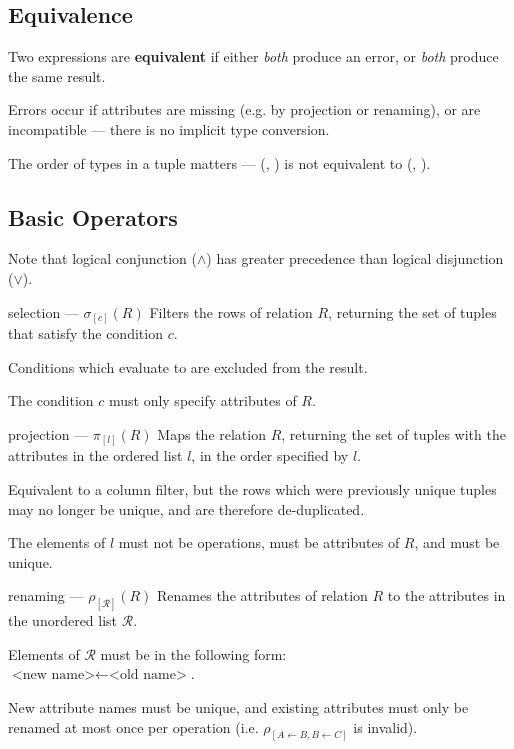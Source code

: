 \subsection{Equivalence}
Two expressions are \textbf{equivalent} if either \textit{both} produce an error, or \textit{both} produce the same result.

Errors occur if attributes are missing (e.g. by projection or renaming), or
are incompatible --- there is no implicit type conversion.

The order of types in a tuple matters --- (, ) is not equivalent to (, ).

\subsection{Basic Operators}
Note that logical conjunction ($\land$) has greater precedence than logical disjunction ($\lor$).

\begin{defn}{selection --- $\sigma_{[c]}(R)$}
    Filters the rows of relation $R$, returning the set of tuples that satisfy the condition $c$.

    Conditions which evaluate to  are excluded from the result.

    The condition $c$ must only specify attributes of $R$.
\end{defn}

\begin{defn}{projection --- $\pi_{[l]}(R)$}
    Maps the relation $R$, returning the set of tuples with the attributes in the ordered list $l$, in the order specified by $l$.

    Equivalent to a column filter, but the rows which were previously unique tuples may no longer be unique, and are therefore de-duplicated.

    The elements of $l$ must not be operations, must be attributes of $R$, and must be unique.
\end{defn}

\begin{defn}{renaming --- $\rho_{[\mathcal{R} ]}(R)$}
    Renames the attributes of relation $R$ to the attributes in the unordered list $\mathcal{R}$.

    Elements of $\mathcal{R}$ must be in the following form: \\
    $\text{<new name>} \leftarrow \text{<old name>}$.

    New attribute names must be unique, and existing attributes must only be renamed at most once per operation (i.e. $\rho_{[A \leftarrow B, B \leftarrow C]}$ is invalid).
\end{defn}

